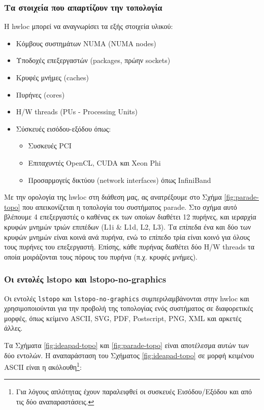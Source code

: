 \subsubsection{Τα στοιχεία που απαρτίζουν την τοπολογία}
Η hwloc μπορεί να αναγνωρίσει τα εξής στοιχεία υλικού:
\begin{itemize}
	\item Κόμβους συστημάτων NUMA (NUMA nodes)
	\item Υποδοχές επεξεργαστών (packages, πρώην sockets)
	\item Κρυφές μνήμες (caches)
	\item Πυρήνες (cores)
	\item H/W threads (PUs - Processing Units)
	\item Σύσκευές εισόδου-εξόδου όπως:
	\begin{itemize}
		\item Συσκευές PCI
		\item Επιταχυντές OpenCL, CUDA και Xeon Phi
		\item Προσαρμογείς δικτύου (network interfaces) όπως InfiniBand	
	\end{itemize}
\end{itemize}

Με την ορολογία της hwloc στη διάθεση μας, ας ανατρέξουμε στο Σχήμα \ref{fig:parade-topo} που απεικονίζεται η τοπολογία του συστήματος parade. Στο σχήμα αυτό βλέπουμε 4 επεξεργαστές ο καθένας εκ των οποίων διαθέτει 12 πυρήνες, και ιεραρχία κρυφών μνημών τριών επιπέδων (L1i \& L1d, L2, L3). Τα επίπεδα ένα και δύο των κρυφών μνημών είναι κοινά ανά πυρήνα, ενώ το επίπεδο τρία είναι κοινό για όλους τους πυρήνες του επεξεργαστή. Επίσης, κάθε πυρήνας διαθέτει δύο H/W threads τα οποία μοιράζονται τους πόρους του πυρήνα (π.χ. κρυφές μνήμες).

\subsubsection{Οι εντολές lstopo και lstopo-no-graphics}
Οι εντολές \texttt{lstopo} και \texttt{lstopo-no-graphics} συμπεριλαμβάνονται στην hwloc και χρησιμοποιούνται για την προβολή της τοπολογίας ενός συστήματος σε διαφορετικές μορφές, όπως κείμενο ASCII, SVG, PDF, Postscript, PNG, XML και αρκετές άλλες.

Τα Σχήματα \ref{fig:ideapad-topo} και \ref{fig:parade-topo} είναι αποτέλεσμα αυτών των δύο εντολών. Η αναπαράσταση του Σχήματος \ref{fig:ideapad-topo} σε μορφή κειμένου ASCII είναι η ακόλουθη\footnote{Για λόγους απλότητας έχουν παραλειφθεί οι συσκευές Εισόδου/Εξόδου και από τις δύο αναπαραστάσεις.}:

